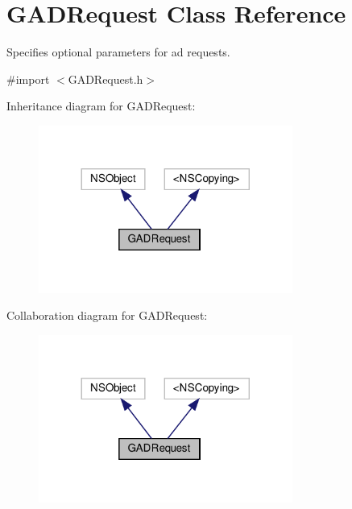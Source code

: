 \hypertarget{interfaceGADRequest}{}\section{G\+A\+D\+Request Class Reference}
\label{interfaceGADRequest}


Specifies optional parameters for ad requests.  




{\ttfamily \#import $<$G\+A\+D\+Request.\+h$>$}



Inheritance diagram for G\+A\+D\+Request\+:
\nopagebreak
\begin{figure}[H]
\begin{center}
\leavevmode
\includegraphics[width=236pt]{interfaceGADRequest__inherit__graph}
\end{center}
\end{figure}


Collaboration diagram for G\+A\+D\+Request\+:
\nopagebreak
\begin{figure}[H]
\begin{center}
\leavevmode
\includegraphics[width=236pt]{interfaceGADRequest__coll__graph}
\end{center}
\end{figure}
